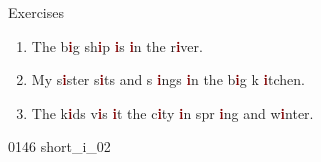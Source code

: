\documentclass[aspectratio=169, xcolor={dvipsnames,table}]{beamer}
\begin{document}
\begin{frame}[plain]{Exercises }
  \LARGE

  \begin{enumerate}
    \item The b\textcolor{Maroon}{\bfseries i}g sh\textcolor{Maroon}{\bfseries i}p \textcolor{Maroon}{\bfseries
            i}s \textcolor{Maroon}{\bfseries i}n the r\textcolor{Maroon}{\bfseries i}ver.

    \item My s\textcolor{Maroon}{\bfseries i}ster s\textcolor{Maroon}{\bfseries i}ts and s\textcolor{Maroon}{\bfseries
            i}ngs \textcolor{Maroon}{\bfseries i}n the b\textcolor{Maroon}{\bfseries i}g k\textcolor{Maroon}{\bfseries
            i}tchen.

    \item The k\textcolor{Maroon}{\bfseries i}ds v\textcolor{Maroon}{\bfseries i}s\textcolor{Maroon}{\bfseries
            i}t the c\textcolor{Maroon}{\bfseries i}ty \textcolor{Maroon}{\bfseries i}n spr\textcolor{Maroon}{\bfseries
            i}ng and w\textcolor{Maroon}{\bfseries i}nter.
  \end{enumerate}
  \hfill{\tiny 0146}\,{\scriptsize {}\,{\tiny short\_i\_02}}
\end{frame}
\end{document}
